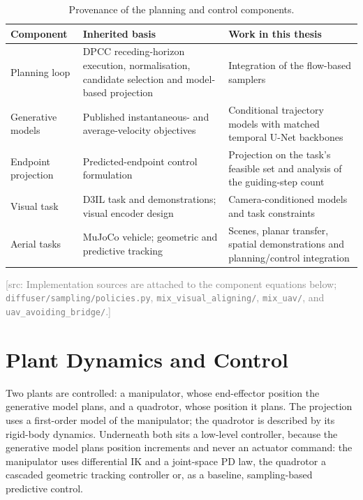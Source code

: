 \documentclass[headsepline,footsepline,footinclude=false,oneside,fontsize=11pt,paper=a4,listof=totoc,bibliography=totoc]{scrbook}
\theoremstyle{definition}
\theoremstyle{plain}
\theoremstyle{remark}
\newif\ifsubmission
\newcommand{\srcnote}[1]{\ifsubmission\else\textcolor{gray}{\footnotesize\textsf{[src: #1]}}\fi}
\begin{document}
\begin{table}[htpb]
  \caption[Method provenance]{Provenance of the planning and control components.}
  \label{tab:method-provenance}
  \centering\small
  \begin{tabularx}{\linewidth}{lLL}
    \toprule
    Component & Inherited basis & Work in this thesis \\
    \midrule
    Planning loop & DPCC receding-horizon execution, normalisation, candidate selection and
      model-based projection \parencite{romer2025diffusion} & Integration of the flow-based samplers \\
    Generative models & Published instantaneous- and average-velocity objectives
      \parencite{lipman2023flow,geng2025meanflow,zhang2025alphaflow} & Conditional trajectory models
      with matched temporal U-Net backbones \\
    Endpoint projection & Predicted-endpoint control formulation \parencite{li2025hardflow}
      & Projection on the task's feasible set and analysis of the guiding-step count \\
    Visual task & D3IL task and demonstrations; visual encoder design
      \parencite{jia2024towards,chi2023diffusion} & Camera-conditioned models and task constraints \\
    Aerial tasks & MuJoCo vehicle; geometric and predictive tracking
      \parencite{zakka2022menagerie,lee2010geometric,howell2022predictive}
      & Scenes, planar transfer, spatial demonstrations and planning/control integration \\
    \bottomrule
  \end{tabularx}
\end{table}
\srcnote{Implementation sources are attached to the component equations below;
\texttt{diffuser/sampling/policies.py}, \texttt{mix\_visual\_aligning/},
\texttt{mix\_uav/}, and \texttt{uav\_avoiding\_bridge/}.}

\section{Plant Dynamics and Control}\label{sec:method:dynamics}\label{sec:method:deployment}

Two plants are controlled: a manipulator, whose end-effector position the generative model plans, and
a quadrotor, whose position it plans. The projection uses a first-order model of the manipulator; the
quadrotor is described by its rigid-body dynamics. Underneath both sits a low-level controller, because
the generative model plans position increments and never an actuator command: the manipulator uses
differential \ac{IK} and a joint-space PD law, the quadrotor a cascaded geometric tracking controller
or, as a baseline, sampling-based predictive control.
\end{document}
